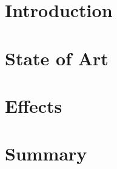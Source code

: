 \documentclass[a4paper, 11pt]{article}
\begin{document}
\newpage
	
\tableofcontents
\newpage
	
\listoffigures
\newpage
	
\section{Introduction}

\section{State of Art}

\section{Effects}

\section{Summary}


\end{document}
